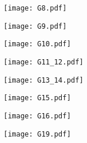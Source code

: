 \documentclass[a4paper,10pt]{article}
\begin{document}
	\begin{figure}
		\centering
		\texttt{[image: G8.pdf]}
	\end{figure}
	
	\begin{figure}
		\centering
		\texttt{[image: G9.pdf]}
	\end{figure}
	
	\begin{figure}
		\centering
		\texttt{[image: G10.pdf]}
	\end{figure}
	
	\begin{figure}
		\centering
		\texttt{[image: G11\_12.pdf]}
	\end{figure}
	
	\begin{figure}
		\centering
		\texttt{[image: G13\_14.pdf]}
	\end{figure}
	
	\begin{figure}
		\centering
		\texttt{[image: G15.pdf]}
	\end{figure}
	
	\begin{figure}
		\centering
		\texttt{[image: G16.pdf]}
	\end{figure}
	
	\begin{figure}
		\centering
		\texttt{[image: G19.pdf]}
	\end{figure}
	
\end{document}
